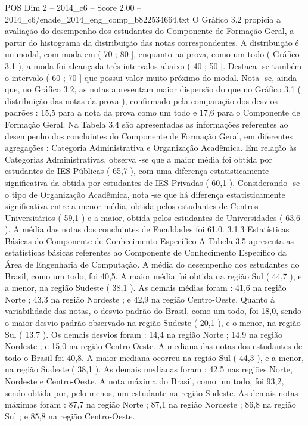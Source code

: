 \begin{textsample}{POS Dim 2 – 2014\_c6 – Score 2.00 – 2014\_c6/enade\_2014\_eng\_comp\_b822534664.txt}
O Gráfico 3.2 propicia a avaliação do desempenho dos estudantes do Componente de Formação Geral, a partir do histograma da distribuição das notas correspondentes.
A distribuição é unimodal, com moda em ( 70 ; 80 ], enquanto na prova, como um todo ( Gráfico 3.1 ), a moda foi alcançada três intervalos abaixo ( 40 ; 50 ].
Destaca -se também o intervalo ( 60 ; 70 ] que possui valor muito próximo do modal.
Nota -se, ainda que, no Gráfico 3.2, as notas apresentam maior dispersão do que no Gráfico 3.1 ( distribuição das notas da prova ), confirmado pela comparação dos desvios padrões : 15,5 para a nota da prova como um todo e 17,6 para o Componente de Formação Geral.
Na Tabela 3.4 são apresentadas as informações referentes ao desempenho dos concluintes do Componente de Formação Geral, em diferentes agregações : Categoria Administrativa e Organização Acadêmica.
Em relação às Categorias Administrativas, observa -se que a maior média foi obtida por estudantes de IES Públicas ( 65,7 ), com uma diferença estatisticamente significativa da obtida por estudantes de IES Privadas ( 60,1 ).
Considerando -se o tipo de Organização Acadêmica, nota -se que há diferença estatisticamente significativa entre a menor média, obtida pelos estudantes de Centros Universitários ( 59,1 ) e a maior, obtida pelos estudantes de Universidades ( 63,6 ).
A média das notas dos concluintes de Faculdades foi 61,0. 3.1.3 Estatísticas Básicas do Componente de Conhecimento Específico A Tabela 3.5 apresenta as estatísticas básicas referentes ao Componente de Conhecimento Específico da Área de Engenharia de Computação.
A média do desempenho dos estudantes do Brasil, como um todo, foi 40,5.
A maior média foi obtida na região Sul ( 44,7 ), e a menor, na região Sudeste ( 38,1 ).
As demais médias foram : 41,6 na região Norte ; 43,3 na região Nordeste ; e 42,9 na região Centro-Oeste.
Quanto à variabilidade das notas, o desvio padrão do Brasil, como um todo, foi 18,0, sendo o maior desvio padrão observado na região Sudeste ( 20,1 ), e o menor, na região Sul ( 13,7 ).
Os demais desvios foram : 14,4 na região Norte ; 14,9 na região Nordeste ; e 15,0 na região Centro-Oeste.
A mediana das notas dos estudantes de todo o Brasil foi 40,8.
A maior mediana ocorreu na região Sul ( 44,3 ), e a menor, na região Sudeste ( 38,1 ).
As demais medianas foram : 42,5 nas regiões Norte, Nordeste e Centro-Oeste.
A nota máxima do Brasil, como um todo, foi 93,2, sendo obtida por, pelo menos, um estudante na região Sudeste.
As demais notas máximas foram : 87,7 na região Norte ; 87,1 na região Nordeste ; 86,8 na região Sul ; e 85,8 na região Centro-Oeste.

\end{textsample}

